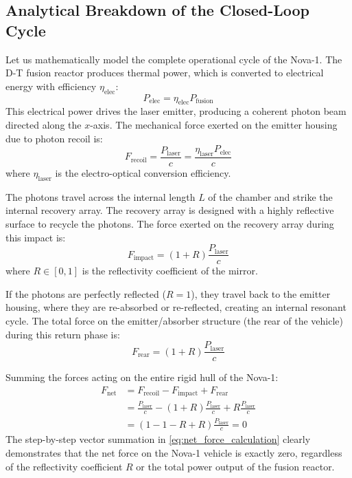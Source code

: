 \documentclass[journal,10pt,twoside]{IEEEtran}
\begin{document}
\subsection{Analytical Breakdown of the Closed-Loop Cycle}
Let us mathematically model the complete operational cycle of the Nova-1. The D-T fusion reactor produces thermal power, which is converted to electrical energy with efficiency $\eta_{\text{elec}}$:
\begin{equation}
P_{\text{elec}} = \eta_{\text{elec}} P_{\text{fusion}}
\label{eq:elec_power}
\end{equation}
This electrical power drives the laser emitter, producing a coherent photon beam directed along the $x$-axis. The mechanical force exerted on the emitter housing due to photon recoil is:
\begin{equation}
F_{\text{recoil}} = \frac{P_{\text{laser}}}{c} = \frac{\eta_{\text{laser}} P_{\text{elec}}}{c}
\label{eq:recoil_force}
\end{equation}
where $\eta_{\text{laser}}$ is the electro-optical conversion efficiency.

The photons travel across the internal length $L$ of the chamber and strike the internal recovery array. The recovery array is designed with a highly reflective surface to recycle the photons. The force exerted on the recovery array during this impact is:
\begin{equation}
F_{\text{impact}} = (1 + R) \frac{P_{\text{laser}}}{c}
\label{eq:impact_force}
\end{equation}
where $R \in [0, 1]$ is the reflectivity coefficient of the mirror.

If the photons are perfectly reflected ($R=1$), they travel back to the emitter housing, where they are re-absorbed or re-reflected, creating an internal resonant cycle. The total force on the emitter/absorber structure (the rear of the vehicle) during this return phase is:
\begin{equation}
F_{\text{rear}} = (1 + R) \frac{P_{\text{laser}}}{c}
\label{eq:rear_force}
\end{equation}

Summing the forces acting on the entire rigid hull of the Nova-1:
\begin{align}
F_{\text{net}} &= F_{\text{recoil}} - F_{\text{impact}} + F_{\text{rear}} \nonumber \\
&= \frac{P_{\text{laser}}}{c} - (1 + R) \frac{P_{\text{laser}}}{c} + R \frac{P_{\text{laser}}}{c} \nonumber \\
&= (1 - 1 - R + R) \frac{P_{\text{laser}}}{c} = 0
\label{eq:net_force_calculation}
\end{align}
The step-by-step vector summation in \eqref{eq:net_force_calculation} clearly demonstrates that the net force on the Nova-1 vehicle is exactly zero, regardless of the reflectivity coefficient $R$ or the total power output of the fusion reactor.
\end{document}
